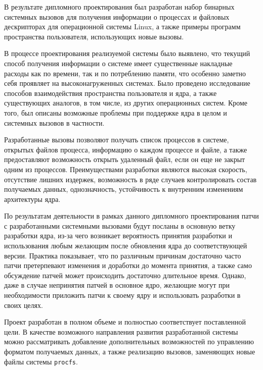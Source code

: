 \pagebreak
{}
\label{sec:outro}

В результате дипломного проектирования был разработан набор бинарных системных
вызовов для получения информации о процессах и файловых дескрипторах для
операционной системы Linux, а также примеры программ пространства пользователя,
использующих новые вызовы.

В процессе проектирования реализуемой системы было выявлено, что текущий способ
получения информации о системе имеет существенные накладные расходы как по
времени, так и по потреблению памяти, что особенно заметно себя проявляет на
высоконагруженных системах. Было проведено исследование способов взаимодействия
пространства пользователя и ядра, а также существующих аналогов, в том числе, из
других операционных систем. Кроме того, был описаны возможные проблемы при
поддержке ядра в целом и системных вызовов в частности.

Разработанные вызовы позволяют получать список процессов в системе, открытых
файлов процесса, информацию о каждом процессе и файле, а также предоставляют
возможность открыть удаленный файл, если он еще не закрыт одним из процессов.
Преимуществами разработки являются высокая скорость, отсутствие лишних издержек,
возможность в ряде случаев контролировать состав получаемых данных,
однозначность, устойчивость к внутренним изменениям архитектуры ядра.

По результатам деятельности в рамках данного дипломного проектирования патчи с
разработанными системными вызовами будут посланы в основную ветку разработки
ядра, из-за чего возникает вероятность принятия разработки и использования
любым желающим после обновления ядра до соответствующей версии. Практика
показывает, что по различным причинам достаточно часто патчи претерпевают
изменения и доработки до момента принятия, а также само обсуждение патчей может
происходить достаточно длительное время. Однако, даже в случае непринятия патчей
в основное ядро, желающие могут при необходимости приложить патчи к своему ядру
и использовать разработки в своих целях.

Проект разработан в полном объеме и полностью соответствует поставленной цели. В
качестве возможного направления развития разработанной системы можно
рассматривать добавление дополнительных возможностей по управлению форматом
получаемых данных, а также реализацию вызовов, заменяющих новые файлы системы
\texttt{procfs}.
